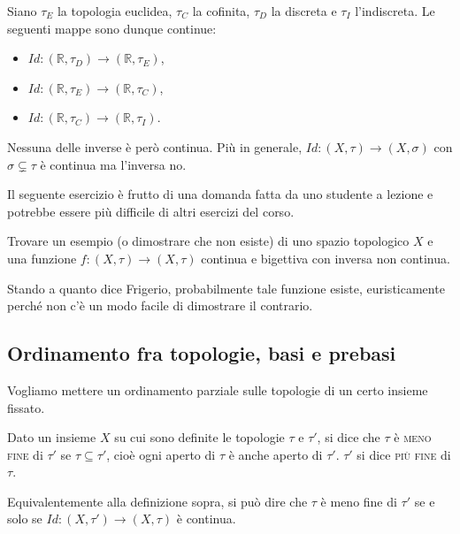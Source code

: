 \documentclass{article}
\begin{document}
\begin{ex}
	Siano $\tau_E$ la topologia euclidea, $\tau_C$ la cofinita, $\tau_D$ la
	discreta e $\tau_I$ l'indiscreta. Le seguenti mappe sono dunque continue:
    \begin{itemize}
	\item $Id:(\mathbb{R}, \tau_D) \rightarrow (\mathbb{R}, \tau_E)$,
    \item $Id:(\mathbb{R}, \tau_E) \rightarrow (\mathbb{R}, \tau_C)$,
    \item $Id:(\mathbb{R}, \tau_C) \rightarrow (\mathbb{R}, \tau_I)$.
    \end{itemize}
    Nessuna delle inverse è però continua. Più in generale, $Id: (X, \tau)
    \rightarrow (X, \sigma)$ con $\sigma \subsetneq \tau$ è continua ma
    l'inversa no.
\end{ex}

\begin{exc}
	Il seguente esercizio è frutto di una domanda fatta da uno studente a
	lezione e potrebbe essere più difficile di altri esercizi del corso.

    \marginpar{\warningsign}
	Trovare un esempio (o dimostrare che non esiste) di uno spazio topologico
	$X$ e una funzione $f: (X, \tau) \rightarrow (X, \tau)$ continua e bigettiva
	con inversa non continua.

    Stando a quanto dice Frigerio, probabilmente tale funzione esiste,
    euristicamente perché non c'è un modo facile di dimostrare il contrario.
\end{exc}

\subsection{Ordinamento fra topologie, basi e prebasi}

Vogliamo mettere un ordinamento parziale sulle topologie di un certo insieme
fissato.

\begin{defn}
Dato un insieme $X$ su cui sono definite le topologie $\tau$ e $\tau'$, si dice
che $\tau$ \`e \textsc{meno fine} di $\tau'$ se $\tau \subseteq \tau'$, cioè
ogni aperto di $\tau$ è anche aperto di $\tau'$. $\tau'$ si dice \textsc{più
fine} di $\tau$.
\end{defn}

\begin{oss}
Equivalentemente alla definizione sopra, si pu\`o dire che $\tau$ \`e meno fine
di $\tau'$ se e solo se ${Id:(X,\tau')\rightarrow(X, \tau)}$ \`e continua.
\end{oss}
\end{document}
